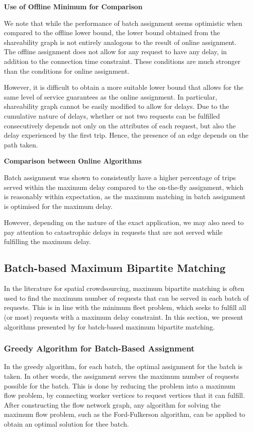 \documentclass[urop]{nurop}
\begin{document}
\vspace{2mm} \noindent \textbf{Use of Offline Minimum for Comparison}

\noindent We note that while the performance of batch assignment seems optimistic when compared to the offline lower bound, the lower bound obtained from the shareability graph is not entirely analogous to the result of online assignment. The offline assignment does not allow for any request to have any delay, in addition to the connection time constraint. These conditions are much stronger than the conditions for online assignment.

However, it is difficult to obtain a more suitable lower bound that allows for the same level of service guarantees as the online assignment. In particular, shareability graph cannot be easily modified to allow for delays. Due to the cumulative nature of delays, whether or not two requests can be fulfilled consecutively depends not only on the attributes of each request, but also the delay experienced by the first trip. Hence, the presence of an edge depends on the path taken.

\vspace{2mm} \noindent \textbf{Comparison between Online Algorithms}

\noindent Batch assignment was shown to consistently have a higher percentage of trips served within the maximum delay compared to the on-the-fly assignment, which is reasonably within expectation, as the maximum matching in batch assignment is optimised for the maximum delay.

However, depending on the nature of the exact application, we may also need to pay attention to catastrophic delays in requests that are not served while fulfilling the maximum delay.

\subsection{Batch-based Maximum Bipartite Matching}
In the literature for spatial crowdsourcing, maximum bipartite matching is often used to find the maximum number of requests that can be served in each batch of requests. This is in line with the minimum fleet problem, which seeks to fulfill all (or most) requests with a maximum delay constraint. In this section, we present algorithms presented by \cite{kazemi} for batch-based maximum bipartite matching.

\subsubsection{Greedy Algorithm for Batch-Based Assignment}
In the greedy algorithm, for each batch, the optimal assignment for the batch is taken. In other words, the assignment serves the maximum number of requests possible for the batch. This is done by reducing the problem into a maximum flow problem, by connecting worker vertices to request vertices that it can fulfill. After constructing the flow network graph, any algorithm for solving the maximum flow problem, such as the Ford-Fulkerson algorithm, can be applied to obtain an optimal solution for thee batch. 
\end{document}
